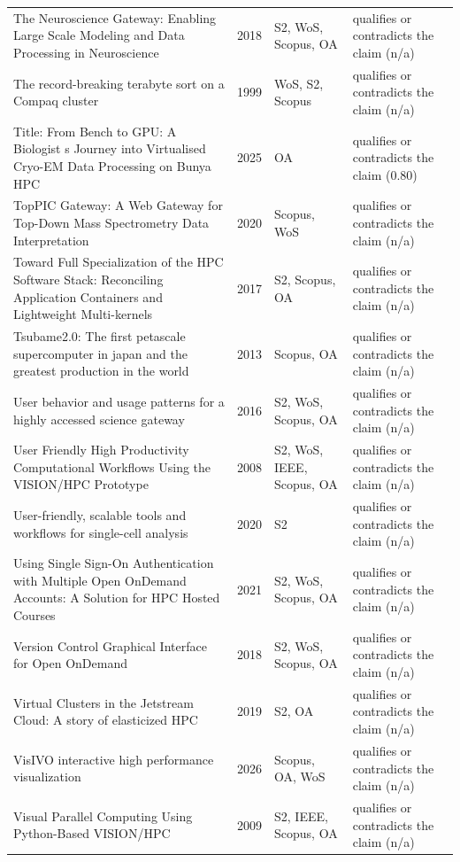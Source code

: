\begin{longtable}{@{}%
  >{\raggedright\arraybackslash}p{}c%
  >{\raggedright\arraybackslash}p{}%
  >{\raggedright\arraybackslash}p{}@{}}
The Neuroscience Gateway: Enabling Large Scale Modeling and Data Processing in Neuroscience & 2018 & S2, WoS, Scopus, OA & qualifies or contradicts the claim (n/a) \\
The record-breaking terabyte sort on a Compaq cluster & 1999 & WoS, S2, Scopus & qualifies or contradicts the claim (n/a) \\
Title: From Bench to GPU: A Biologist s Journey into Virtualised Cryo-EM Data Processing on Bunya HPC & 2025 & OA & qualifies or contradicts the claim (0.80) \\
TopPIC Gateway: A Web Gateway for Top-Down Mass Spectrometry Data Interpretation & 2020 & Scopus, WoS & qualifies or contradicts the claim (n/a) \\
Toward Full Specialization of the HPC Software Stack: Reconciling Application Containers and Lightweight Multi-kernels & 2017 & S2, Scopus, OA & qualifies or contradicts the claim (n/a) \\
Tsubame2.0: The first petascale supercomputer in japan and the greatest production in the world & 2013 & Scopus, OA & qualifies or contradicts the claim (n/a) \\
User behavior and usage patterns for a highly accessed science gateway & 2016 & S2, WoS, Scopus, OA & qualifies or contradicts the claim (n/a) \\
User Friendly High Productivity Computational Workflows Using the VISION/HPC Prototype & 2008 & S2, WoS, IEEE, Scopus, OA & qualifies or contradicts the claim (n/a) \\
User-friendly, scalable tools and workflows for single-cell analysis & 2020 & S2 & qualifies or contradicts the claim (n/a) \\
Using Single Sign-On Authentication with Multiple Open OnDemand Accounts: A Solution for HPC Hosted Courses & 2021 & S2, WoS, Scopus, OA & qualifies or contradicts the claim (n/a) \\
Version Control Graphical Interface for Open OnDemand & 2018 & S2, WoS, Scopus, OA & qualifies or contradicts the claim (n/a) \\
Virtual Clusters in the Jetstream Cloud: A story of elasticized HPC & 2019 & S2, OA & qualifies or contradicts the claim (n/a) \\
VisIVO interactive high performance visualization & 2026 & Scopus, OA, WoS & qualifies or contradicts the claim (n/a) \\
Visual Parallel Computing Using Python-Based VISION/HPC & 2009 & S2, IEEE, Scopus, OA & qualifies or contradicts the claim (n/a) \\

\end{longtable}
